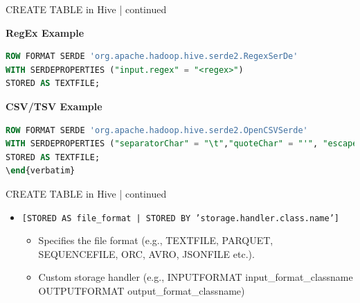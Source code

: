 \begin{frame}[fragile]{CREATE TABLE in Hive | continued}


\textbf{RegEx Example}
\begin{lstlisting}[caption={RegEx Example},language=SQL]
ROW FORMAT SERDE 'org.apache.hadoop.hive.serde2.RegexSerDe'
WITH SERDEPROPERTIES ("input.regex" = "<regex>")
STORED AS TEXTFILE;
\end{lstlisting}
  
\textbf{CSV/TSV Example}
\begin{lstlisting}[caption={CSV/TSV Example},language=SQL]
ROW FORMAT SERDE 'org.apache.hadoop.hive.serde2.OpenCSVSerde'
WITH SERDEPROPERTIES ("separatorChar" = "\t","quoteChar" = "'", "escapeChar" = "\\")
STORED AS TEXTFILE;
\end{verbatim}
\end{lstlisting}	  


  \end{frame}
  
  \begin{frame}{CREATE TABLE in Hive | continued}
	\begin{tcolorbox}[colback=white,colframe=black,title= Part 4: File Format and Storage Handler]
		\small
	\begin{itemize}
	  \item \texttt{[STORED AS file\_format | STORED BY 'storage.handler.class.name']}
	  \begin{itemize}
		\item Specifies the file format (e.g., TEXTFILE, PARQUET, SEQUENCEFILE, ORC, AVRO, JSONFILE etc.).
		\item Custom storage handler (e.g., INPUTFORMAT input_format_classname OUTPUTFORMAT output_format_classname)
	  \end{itemize}
	\end{itemize}
	\end{tcolorbox}
  \end{frame}


